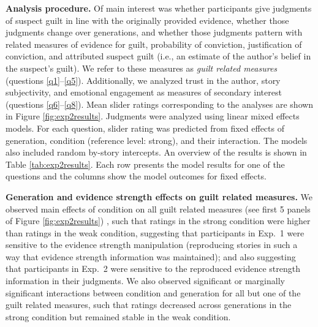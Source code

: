 \documentclass[10pt,letterpaper]{article}
\newcommand{\ek}[1]{\textcolor{Orange}{[ek: #1]}}
\begin{document}
\textbf{Analysis procedure.} Of main interest was whether participants give judgments of suspect guilt in line with the originally provided evidence, whether those judgments change over generations, and whether those judgments pattern with related measures of evidence for guilt, probability of conviction, justification of conviction, and attributed suspect guilt (i.e., an estimate of the author's belief in the suspect's guilt). We refer to these measures as \emph{guilt related measures} (questions \ref{q1}--\ref{q5}). Additionally, we analyzed trust in the author, story subjectivity, and emotional engagement as measures of secondary interest (questions \ref{q6}--\ref{q8}). Mean slider ratings corresponding to the analyses are shown in Figure \ref{fig:exp2results}. Judgments were analyzed using linear mixed effects models. For each question, slider rating was predicted from fixed effects of generation, condition (reference level: strong), and their interaction. The models also included random by-story intercepts. An overview of the results is shown in Table \ref{tab:exp2results}. Each row presents the model results for one of the questions and the columns show the model outcomes for fixed effects. 


\textbf{Generation and evidence strength effects on guilt related measures.} We observed  main effects of condition on all guilt related measures (see first 5 panels of Figure \ref{fig:exp2results})
, such that ratings in the strong condition were higher than ratings in the weak condition, suggesting that participants in Exp.~1 were sensitive to the evidence strength manipulation (reproducing stories in such a way that evidence strength information was maintained); and also suggesting that participants in Exp.~2 were sensitive to the reproduced evidence strength information in their judgments. %
We also observed significant or marginally significant interactions between condition and generation for all but one of the guilt related measures, such that ratings decreased across generations in the strong condition but remained stable in the weak condition.
\end{document}
